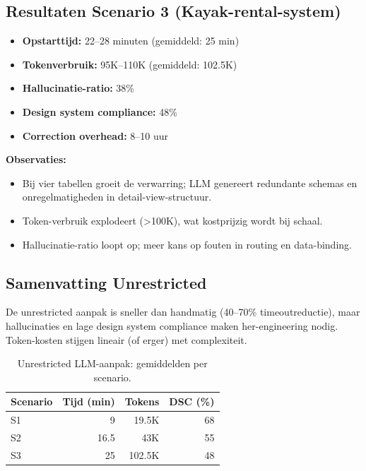\subsection{Resultaten Scenario 3 (Kayak-rental-system)}

\begin{itemize}
  \item \textbf{Opstarttijd:} 22--28 minuten (gemiddeld: 25 min)
  \item \textbf{Tokenverbruik:} 95K--110K (gemiddeld: 102.5K)
  \item \textbf{Hallucinatie-ratio:} 38\%
  \item \textbf{Design system compliance:} 48\%
  \item \textbf{Correction overhead:} 8--10 uur
\end{itemize}

\noindent
\textbf{Observaties:}
\begin{itemize}
  \item Bij vier tabellen groeit de verwarring; LLM genereert redundante schemas en onregelmatigheden in detail-view-structuur.
  \item Token-verbruik explodeert (>100K), wat kostprijzig wordt bij schaal.
  \item Hallucinatie-ratio loopt op; meer kans op fouten in routing en data-binding.
\end{itemize}

\subsection{Samenvatting Unrestricted}

De unrestricted aanpak is sneller dan handmatig (40--70\% timeoutreductie), maar hallucinaties en lage design system compliance maken her-engineering nodig. Token-kosten stijgen lineair (of erger) met complexiteit.

\begin{table}[h]
\small
\begin{tabularx}{\textwidth}{|l|r|r|r|}
\hline
\textbf{Scenario} & \textbf{Tijd (min)} & \textbf{Tokens} & \textbf{DSC (\%)} \\
\hline
S1 & 9 & 19.5K & 68 \\
S2 & 16.5 & 43K & 55 \\
S3 & 25 & 102.5K & 48 \\
\hline
\end{tabularx}
\caption{Unrestricted LLM-aanpak: gemiddelden per scenario.}
\label{tab:unrestricted}
\end{table}

